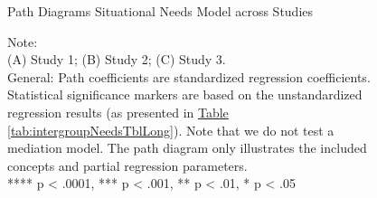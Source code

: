 \documentclass[man, 12pt, a4paper, mask]{apa7}
\theoremstyle{break}
\theoremstyle{plain}
\newcommand{\tblref}[2][]{\hyperref[#2]{Table \ref*{#2}#1}}
\providecommand{\DIFaddbeginFL}{} %
\providecommand{\DIFaddendFL}{} %
\providecommand{\DIFdelbeginFL}{} %
\providecommand{\DIFdelendFL}{} %
\newcommand{\DIFscaledelfig}{0.5}
\newlength{\DIFdelgraphicswidth} %
\newlength{\DIFdelgraphicsheight} %
\newcommand{\DIFaddincludegraphics}[2][]{{\color{blue}\fbox{\DIFOincludegraphics[#1]{#2}}}} %
\newcommand{\DIFdelincludegraphics}[2][]{%
\sbox{\DIFdelgraphicsbox}{\DIFOincludegraphics[#1]{#2}}%
\settoboxwidth{\DIFdelgraphicswidth}{\DIFdelgraphicsbox} %
\settoboxtotalheight{\DIFdelgraphicsheight}{\DIFdelgraphicsbox} %
\scalebox{\DIFscaledelfig}{%
\parbox[b]{\DIFdelgraphicswidth}{\usebox{\DIFdelgraphicsbox}\\[-\baselineskip] \rule{\DIFdelgraphicswidth}{0em}}\llap{\resizebox{\DIFdelgraphicswidth}{\DIFdelgraphicsheight}{%
\setlength{\unitlength}{\DIFdelgraphicswidth}%
\begin{picture}(1,1)%
\thicklines\linethickness{2pt} %
{\color[rgb]{1,0,0}\put(0,0){\framebox(1,1){}}}%
{\color[rgb]{1,0,0}\put(0,0){\line( 1,1){1}}}%
{\color[rgb]{1,0,0}\put(0,1){\line(1,-1){1}}}%
\end{picture}%
}\hspace*{3pt}}} %
} %
\DeclareRobustCommand{\DIFaddbeginFL}{\DIFOaddbeginFL \let\includegraphics\DIFaddincludegraphics} %
\DeclareRobustCommand{\DIFaddendFL}{\DIFOaddendFL \let\includegraphics\DIFOincludegraphics} %
\DeclareRobustCommand{\DIFdelbeginFL}{\DIFOdelbeginFL \let\includegraphics\DIFdelincludegraphics} %
\DeclareRobustCommand{\DIFdelendFL}{\DIFOaddendFL \let\includegraphics\DIFOincludegraphics} %
\begin{document}
\begin{figure}
  \caption{Path Diagrams Situational Needs Model across Studies}
  \label{fig:MainPaths}
  \begin{center}
    
  \end{center}
  \DIFdelbeginFL %
\DIFdelendFL \DIFaddbeginFL \caption*{Note: \\
  (A) Study 1; (B) Study 2; (C) Study 3.\\
  General: Path coefficients are standardized regression coefficients. Statistical significance markers are based on the unstandardized regression results (as presented in \tblref{tab:intergroupNeedsTblLong}). Note that we do not test a mediation model. The path diagram only illustrates the included concepts and partial regression parameters.\\
  **** p < .0001, *** p < .001, ** p < .01, * p < .05}
\DIFaddendFL \end{figure}
\end{document}
